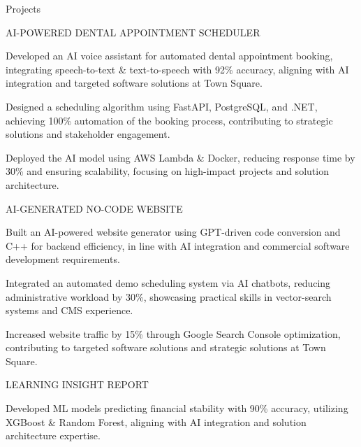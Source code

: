 \documentclass{resume} %
\begin{document}
    \begin{rSection}{Projects}
                    \begin{rSubsection}
                                    {AI{-}POWERED DENTAL APPOINTMENT SCHEDULER}
                                {}{}{}
                                    \item Developed an AI voice assistant for automated dental appointment booking, integrating speech{-}to{-}text \& text{-}to{-}speech with 92\% accuracy, aligning with AI integration and targeted software solutions at Town Square.
                                    \item Designed a scheduling algorithm using FastAPI, PostgreSQL, and .NET, achieving 100\% automation of the booking process, contributing to strategic solutions and stakeholder engagement.
                                    \item Deployed the AI model using AWS Lambda \& Docker, reducing response time by 30\% and ensuring scalability, focusing on high{-}impact projects and solution architecture.
                            \end{rSubsection}
                    \begin{rSubsection}
                                    {AI{-}GENERATED NO{-}CODE WEBSITE}
                                {}{}{}
                                    \item Built an AI{-}powered website generator using GPT{-}driven code conversion and C++ for backend efficiency, in line with AI integration and commercial software development requirements.
                                    \item Integrated an automated demo scheduling system via AI chatbots, reducing administrative workload by 30\%, showcasing practical skills in vector{-}search systems and CMS experience.
                                    \item Increased website traffic by 15\% through Google Search Console optimization, contributing to targeted software solutions and strategic solutions at Town Square.
                            \end{rSubsection}
                    \begin{rSubsection}
                                    {LEARNING INSIGHT REPORT}
                                {}{}{}
                                    \item Developed ML models predicting financial stability with 90\% accuracy, utilizing XGBoost \& Random Forest, aligning with AI integration and solution architecture expertise.

\end{rSubsection}
\end{rSection}
\end{document}
